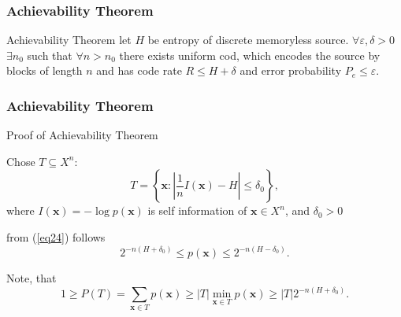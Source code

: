 \documentclass[14pt]{beamer}
\renewcommand{\vec}[1]{\ensuremath{\boldsymbol{#1}}}
\begin{document}


\begin{frame}
\frametitle{Achievability Theorem}


    \begin{theorem} {Achievability Theorem}
    let $H$ be entropy of discrete memoryless source. $\forall \varepsilon ,\delta > 0$ $\exists n_0 $ such that
    $\forall n > n_0 $ there exists uniform cod, which encodes the source by blocks of length $n$ and has code rate $R \le H + \delta $ and error probability $P_e \le \varepsilon $.
    \end{theorem}

\end{frame}


\begin{frame}
\frametitle{Achievability Theorem}
Proof of Achievability Theorem
\begin{itemize}
\small{  

    \item Chose  $T \subseteq X^n$:
    \begin{equation}
    \label{eq24} T = \left\{ {\vec x:\left| {\frac{1}{n}I(\vec x) - H}
    \right| \le \delta _0 } \right\},
    \end{equation}
    where $I(\vec x) = - \log p(\vec x)$ is self information of $\vec x \in X^n$, and $\delta _0 > 0 $
    
    \item from (\ref{eq24}) follows
    \begin{equation}
    \label{eq25} 2^{ - n(H + \delta _0 )} \le p(\vec x) \le 2^{ - n(H
    - \delta _0 )}.
    \end{equation}

    \item Note, that
    \[
    1 \ge P(T) = \sum\limits_{\vec x \in T} {p(\vec x)} \ge \vert
    T\vert \mathop {\min }\limits_{\vec x \in T} p(\vec x) \ge \vert
    T\vert 2^{ - n(H + \delta _0 )}.
    \]
}
\end{itemize}
\end{frame}
\end{document}
